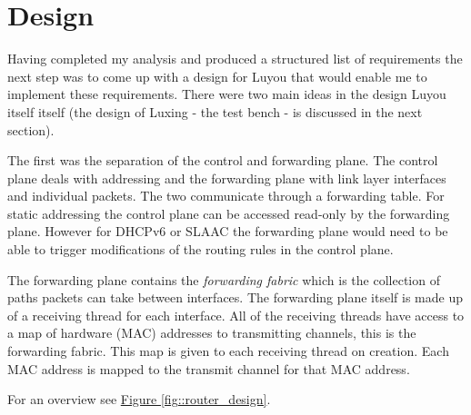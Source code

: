 \documentclass[12pt,a4paper,twoside,openright]{report}
\begin{document}
\section{Design}
\label{sec::design}

Having completed my analysis and produced a structured list of requirements the next step was to come up with a design for Luyou that would enable me to implement these requirements.  There were two main ideas in the design Luyou itself itself (the design of Luxing - the test bench - is discussed in the next section). 

\bigskip

The first was the separation of the control and forwarding plane. The control plane deals with addressing and the forwarding plane with link layer interfaces and individual packets.  The two communicate through a forwarding table. For static addressing the control plane can be accessed read-only by the forwarding plane. However for DHCPv6 or SLAAC the forwarding plane would need to be able to trigger modifications of the routing rules in the control plane. 

The forwarding plane contains the \textit{forwarding fabric} which is the collection of paths packets can take between interfaces. The forwarding plane itself is made up of a receiving thread for each interface. All of the receiving threads have access to a map of hardware (MAC) addresses to transmitting channels, this is the forwarding fabric. This map is given to each receiving thread on creation.  Each MAC address is mapped to the transmit channel for that MAC address. 

For an overview see \hyperref[fig::router_design]{Figure }\ref{fig::router_design}.
\end{document}
